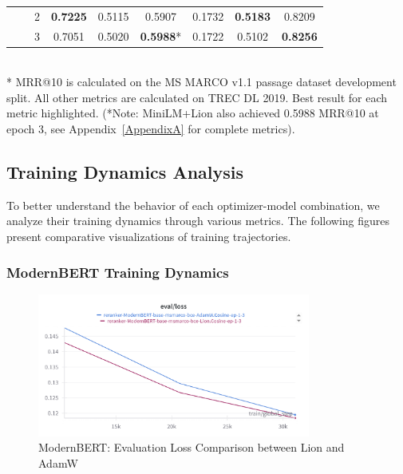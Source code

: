 \begin{table}[htbp]
{\begin{tabular}{l l c c c c c c c}
    & & 2 & \cellcolor{yellow!50}\textbf{0.7225} & 0.5115 & 0.5907 & 0.1732 & \cellcolor{yellow!50}\textbf{0.5183} & 0.8209 \\
    & & 3 & 0.7051 & 0.5020 & \cellcolor{yellow!50}\textbf{0.5988}* & 0.1722 & 0.5102 & \cellcolor{yellow!50}\textbf{0.8256} \\
\bottomrule
\end{tabular}%
}
\vspace{1em}\\
\footnotesize{* MRR@10 is calculated on the MS MARCO v1.1 passage dataset development split. All other metrics are calculated on TREC DL 2019. Best result for each metric highlighted. (*Note: MiniLM+Lion also achieved 0.5988 MRR@10 at epoch 3, see Appendix~\ref{AppendixA} for complete metrics).}
\end{table}

\subsection{Training Dynamics Analysis}

To better understand the behavior of each optimizer-model combination, we analyze their training dynamics through various metrics. The following figures present comparative visualizations of training trajectories.

\subsubsection{ModernBERT Training Dynamics}

\begin{figure}[H]
    \centering
    \includegraphics[width=0.8\textwidth]{Figures/modernBERT-Lion-AdamW-eval_loss.png}
    \caption{ModernBERT: Evaluation Loss Comparison between Lion and AdamW}
    \label{fig:modernbert_eval_loss}
\end{figure}

